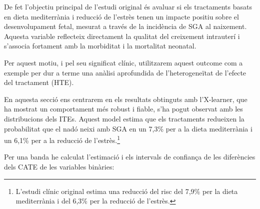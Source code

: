 \documentclass[../main.tex]{subfiles}
\begin{document}
    De fet l'objectiu principal de l’estudi original és avaluar si els tractaments basats en dieta mediterrània i reducció de l’estrès tenen un impacte positiu sobre el desenvolupament fetal, mesurat a través de la incidència de SGA al naixement. Aquesta variable reflecteix directament la qualitat del creixement intrauterí i s’associa fortament amb la morbiditat i la mortalitat neonatal.\par
    Per aquest motiu, i pel seu significat clínic, utilitzarem aquest outcome com a exemple per dur a terme una anàlisi aprofundida de l’heterogeneïtat de l’efecte del tractament (HTE).\par
    En aquesta secció ens centrarem en els resultats obtinguts amb l’X-learner, que ha mostrat un comportament més robust i fiable, s’ha pogut observat amb les distribucions dels ITEs. Aquest model estima que els tractaments redueixen la probabilitat que el nadó neixi amb SGA en un 7,3\% per a la dieta mediterrània i un 6,1\% per a la reducció de l’estrès.\footnote{L’estudi clínic original estima una reducció del risc del 7,9\% per la dieta mediterrània i del 6,3\% per la reducció de l’estrès.}\par

    Per una banda he calculat l'estimació i els intervals de confiança de les diferències dels CATE de les variables binàries:
    
\end{document}
